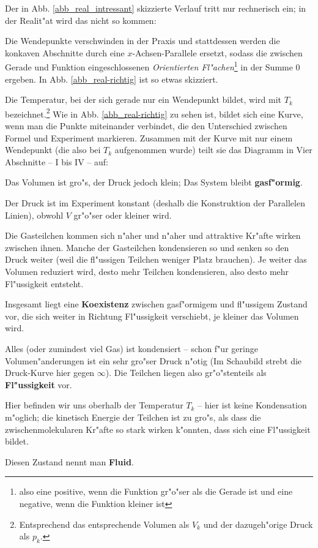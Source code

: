 \begin{Wichtig}
Der in Abb. \ref{abb_real_intressant} skizzierte
Verlauf tritt nur rechnerisch ein; in der Realit"at wird das nicht so
kommen:   
\end{Wichtig}
Die Wendepunkte verschwinden in der Praxis und stattdessen
werden die konkaven Abschnitte durch eine $x$-Achsen-Parallele
ersetzt, sodass die zwischen Gerade und Funktion eingeschlossenen
\emph{Orientierten Fl"achen}\footnote{also eine positive, wenn die
  Funktion gr"o"ser als die Gerade ist und eine negative, wenn die
  Funktion kleiner ist} in der Summe $0$ ergeben.
In Abb. \ref{abb_real-richtig} ist so etwas skizziert.

Die Temperatur, bei der sich gerade nur ein Wendepunkt bildet, wird
mit $T_k$ bezeichnet.\footnote{Entsprechend das entsprechende Volumen
  als $V_k$ und der dazugeh"orige Druck als $p_k$.} Wie in
Abb. \ref{abb_real-richtig} zu sehen ist, bildet sich eine Kurve, wenn
man die Punkte miteinander verbindet, die den Unterschied zwischen
Formel und Experiment markieren. Zusammen mit der Kurve mit nur einem
Wendepunkt (die also bei $T_k$ aufgenommen wurde) teilt sie das
Diagramm in Vier Abschnitte -- I bis IV -- auf:

\begin{description}[\setlabelstyle{\bfseries\slshape}]
\item[Bereich III] Das Volumen ist gro"s, der Druck jedoch klein; Das
   System bleibt \textbf{gasf"ormig}.
\item[Bereich II] Der Druck ist im Experiment konstant (deshalb die
   Konstruktion der Parallelen Linien), obwohl $V$ gr"o"ser oder kleiner
   wird.

   Die Gasteilchen kommen sich n"aher und n"aher und attraktive Kr"afte
   wirken zwischen ihnen. Manche der Gasteilchen kondensieren so und
   senken so den Druck weiter (weil die fl"ussigen Teilchen weniger
   Platz brauchen). Je weiter das Volumen reduziert wird, desto mehr
   Teilchen kondensieren, also desto mehr Fl"ussigkeit entsteht.

   Insgesamt liegt eine \textbf{Koexistenz} zwischen gasf"ormigem und
   fl"ussigem Zustand vor, die sich weiter in Richtung Fl"ussigkeit
   verschiebt, je kleiner das Volumen wird.

\item[Bereich I] Alles (oder zumindest viel Gas) ist kondensiert --
   schon f"ur geringe Volumen"anderungen ist ein sehr gro"ser Druck n"otig
   (Im Schaubild strebt die Druck-Kurve hier gegen $\infty$). Die
   Teilchen liegen also gr"o"stenteils als \textbf{Fl"ussigkeit} vor.


\item[Bereich IV] Hier befinden wir uns oberhalb der Temperatur $T_k$
   -- hier ist keine Kondensation m"oglich; die kinetisch Energie der
   Teilchen ist zu gro"s, als dass die zwischenmolekularen Kr"afte so
   stark wirken k"onnten, dass sich eine Fl"ussigkeit bildet.

Diesen Zustand nennt man \textbf{Fluid}.
\end{description}

